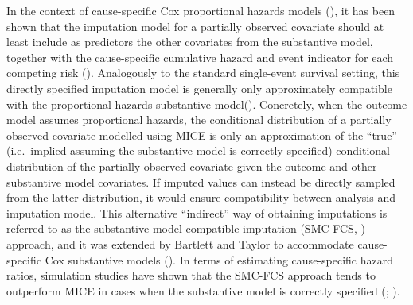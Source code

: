 \documentclass[
  letterpaper,
  paper=240mm:170mm,
  twoside=true,
  open=right,
  fontsize=10pt,
  pagesize=false,
  BCOR=15mm,
  DIV=14,
  headinclude=true,
  footinclude=false,
  headsepline=on]{scrbook}
\begin{document}
In the context of cause-specific Cox proportional hazards models
(), it has been shown that the imputation model for a partially
observed covariate should at least include as predictors the other
covariates from the substantive model, together with the cause-specific
cumulative hazard and event indicator for each competing risk
(). Analogously to the standard single-event survival
setting, this directly specified imputation model is generally only
approximately compatible with the proportional hazards substantive
model(). Concretely, when the outcome model assumes proportional
hazards, the conditional distribution of a partially observed covariate
modelled using MICE is only an approximation of the ``true''
(i.e.~implied assuming the substantive model is correctly specified)
conditional distribution of the partially observed covariate given the
outcome and other substantive model covariates. If imputed values can
instead be directly sampled from the latter distribution, it would
ensure compatibility between analysis and imputation model. This
alternative ``indirect'' way of obtaining imputations is referred to as
the substantive-model-compatible imputation (SMC-FCS,
) approach, and it was extended by Bartlett and
Taylor to accommodate cause-specific Cox substantive models
(). In terms of estimating cause-specific hazard ratios,
simulation studies have shown that the SMC-FCS approach tends to
outperform MICE in cases when the substantive model is correctly
specified
(;
).
\end{document}
